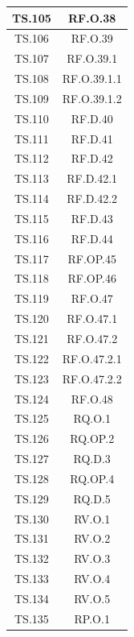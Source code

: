 \documentclass[10pt, a4paper]{article}
\begin{document}
\begin{xltabular}{\textwidth}{|c|c|}
\hline
TS.105 & RF.O.38 \\
\hline
TS.106 & RF.O.39 \\
\hline
TS.107 & RF.O.39.1 \\
\hline
TS.108 & RF.O.39.1.1 \\
\hline
TS.109 & RF.O.39.1.2 \\
\hline
TS.110 & RF.D.40 \\
\hline
TS.111 & RF.D.41 \\
\hline
TS.112 & RF.D.42 \\
\hline
TS.113 & RF.D.42.1 \\
\hline
TS.114 & RF.D.42.2 \\
\hline
TS.115 & RF.D.43 \\
\hline
TS.116 & RF.D.44 \\
\hline
TS.117 & RF.OP.45 \\
\hline
TS.118 & RF.OP.46 \\
\hline
TS.119 & RF.O.47 \\
\hline
TS.120 & RF.O.47.1 \\
\hline
TS.121 & RF.O.47.2 \\
\hline
TS.122 & RF.O.47.2.1 \\
\hline
TS.123 & RF.O.47.2.2 \\
\hline
TS.124 & RF.O.48 \\
\hline
TS.125 & RQ.O.1 \\
\hline
TS.126 & RQ.OP.2 \\
\hline
TS.127 & RQ.D.3 \\
\hline
TS.128 & RQ.OP.4 \\
\hline
TS.129 & RQ.D.5 \\
\hline
TS.130 & RV.O.1 \\
\hline
TS.131 & RV.O.2 \\
\hline
TS.132 & RV.O.3 \\
\hline
TS.133 & RV.O.4 \\
\hline
TS.134 & RV.O.5 \\
\hline
TS.135 & RP.O.1 \\
\hline

\end{xltabular}

    
\end{document}
